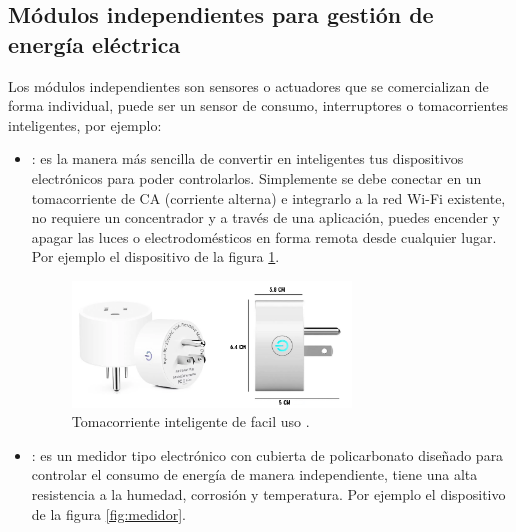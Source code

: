 \subsection{Módulos independientes para gestión de energía eléctrica}
Los módulos independientes son sensores o actuadores  que se comercializan de forma individual, puede ser un sensor de consumo, interruptores o tomacorrientes inteligentes, por ejemplo: 
\begin{itemize}

\item {}: es la manera más sencilla de convertir en inteligentes tus dispositivos electrónicos para poder controlarlos. Simplemente se debe conectar en un tomacorriente de CA (corriente alterna) e integrarlo a la red Wi-Fi existente, no requiere un concentrador y a través de una aplicación, puedes encender y apagar las luces o electrodomésticos en forma remota desde cualquier lugar. Por ejemplo el dispositivo de la figura \ref{fig:tomacorriente}.

\begin{figure}[htbp]
	\centering
\includegraphics[width=0.7\textwidth]{./Figures/tomacorriente.png}
	\caption{Tomacorriente inteligente de facil uso \protect\footnotemark.}
	\label{fig:tomacorriente}
\end{figure}


\vspace{1cm}
\vspace{1cm}
\vspace{1cm}
\vspace{1cm}
\vspace{1cm}
\vspace{1cm}
\vspace{1cm}
\vspace{1cm}



\item {}: es un medidor tipo electrónico con cubierta de policarbonato diseñado para controlar el consumo de energía de manera independiente, tiene una alta resistencia a la humedad, corrosión y temperatura. Por ejemplo el dispositivo de la figura \ref{fig:medidor}.


\end{itemize}
